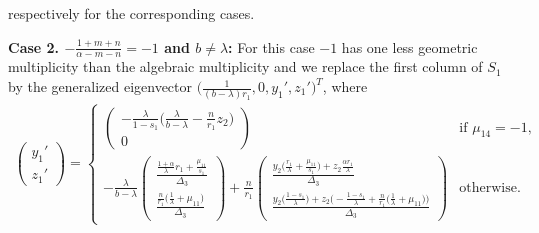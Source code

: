\documentclass[a4paper,11pt]{article}
\begin{document}
respectively for the corresponding cases. 

{\bf Case 2. $-\frac{1+m+n}{\alpha-m-n}= -1$ and $b\ne\lambda$: }
For this case $-1$ has one less geometric multiplicity than the algebraic multiplicity and we replace the first column of $S_1$ by the generalized eigenvector $\big(\frac{1}{(b-\lambda)r_1}, 0, y_1', z_1'\big)^T$, where
\begin{equation} \label{eq:S1-2}
\begin{aligned}
\begin{pmatrix}
 y_1'\\z_1'
\end{pmatrix}
=\begin{cases}
  \begin{pmatrix}
  -\frac{\lambda}{1-s_1}\big(\frac{\lambda}{b-\lambda} -\frac{n}{r_1}z_2\big)\\0
  \end{pmatrix} & \text{if $\mu_{14}=-1$,}\\
  -\frac{\lambda}{b-\lambda}
  \begin{pmatrix}
  \frac{ \frac{1+\alpha}{\lambda}r_1 + \frac{\mu_{11}}{s_1} }{ \Delta_3 }\\
  \frac{ \frac{n}{r_1}\big(\frac{1}{\lambda} + \mu_{11}\big) }{ \Delta_3 }
  \end{pmatrix} + 
  \frac{n}{r_1}
  \begin{pmatrix}
  \frac{ y_2\big(\frac{r_1}{\lambda} + \frac{\mu_{11}}{s_1}\big) + z_2\frac{\alpha r_1}{\lambda} }{ \Delta_3 }\\
  \frac{ y_2\big(\frac{1-s_1}{\lambda}\big) + z_2\big(-\frac{1-s_1}{\lambda}+\frac{n}{r_1}\big(\frac{1}{\lambda}+\mu_{11}\big)\big) }{ \Delta_3 }
  \end{pmatrix} & \text{otherwise.}
 \end{cases}
\end{aligned}
\end{equation}
\end{document}
